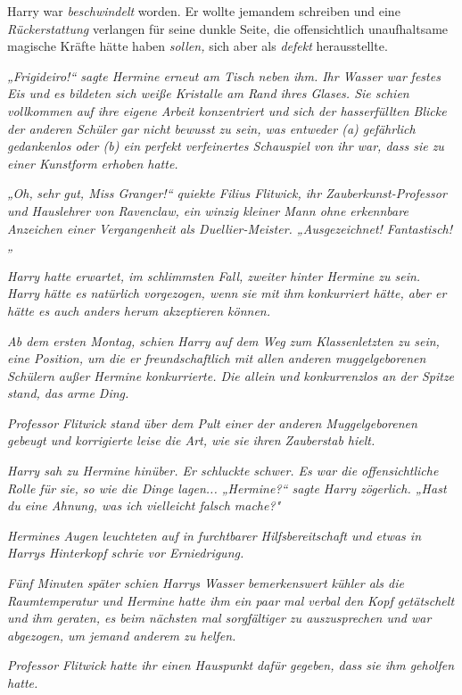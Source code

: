 {Harry war \emph{beschwindelt} worden. Er wollte jemandem schreiben und eine \emph{Rückerstattung} verlangen für seine dunkle Seite, die offensichtlich unaufhaltsame magische Kräfte hätte haben \emph{sollen,} sich aber als \emph{defekt} herausstellte.

\emph{„Frigideiro!“ sagte Hermine erneut am Tisch neben ihm. Ihr Wasser war} \emph{festes Eis und es bildeten sich weiße Kristalle am Rand ihres Glases. Sie schien vollkommen auf ihre eigene Arbeit konzentriert und sich der hasserfüllten Blicke der anderen Schüler gar nicht bewusst zu sein, was entweder (a) gefährlich gedankenlos oder (b) ein perfekt verfeinertes Schauspiel von ihr war, dass sie zu einer Kunstform erhoben hatte.}

\emph{„Oh,} \emph{\emph{sehr}} \emph{gut, Miss Granger!“ quiekte Filius Flitwick, ihr Zauberkunst-Professor und Hauslehrer von Ravenclaw, ein winzig kleiner Mann ohne erkennbare Anzeichen einer Vergangenheit als Duellier-Meister. „Ausgezeichnet! Fantastisch!„}

\emph{Harry hatte erwartet, im schlimmsten Fall, zweiter hinter Hermine zu sein. Harry hätte es natürlich vorgezogen, wenn} \emph{\emph{sie}} \emph{mit} \emph{\emph{ihm}} \emph{konkurriert hätte, aber er hätte es auch anders herum akzeptieren können.}

\emph{Ab dem ersten Montag, schien Harry auf dem Weg zum Klassenletzten zu sein, eine Position, um die er freundschaftlich mit allen anderen muggelgeborenen Schülern außer Hermine konkurrierte. Die allein und konkurrenzlos an der Spitze stand, das arme Ding.}

\emph{Professor Flitwick stand über dem Pult einer der anderen Muggelgeborenen gebeugt und korrigierte leise die Art, wie sie ihren Zauberstab hielt.}

\emph{Harry sah zu Hermine hinüber. Er schluckte schwer. Es war die offensichtliche Rolle für sie, so wie die Dinge lagen... „Hermine?“ sagte Harry zögerlich. „Hast du eine Ahnung, was ich vielleicht falsch mache?"}

\emph{Hermines Augen leuchteten auf in furchtbarer Hilfsbereitschaft und etwas in Harrys Hinterkopf schrie vor Erniedrigung.}

\emph{Fünf Minuten später schien Harrys Wasser bemerkenswert kühler als die Raumtemperatur und Hermine hatte ihm ein paar mal verbal den Kopf getätschelt und ihm geraten, es beim nächsten mal sorgfältiger zu auszusprechen und war abgezogen, um jemand anderem zu helfen.}

\emph{Professor Flitwick hatte ihr einen Hauspunkt dafür gegeben, dass sie ihm geholfen hatte.}

}
